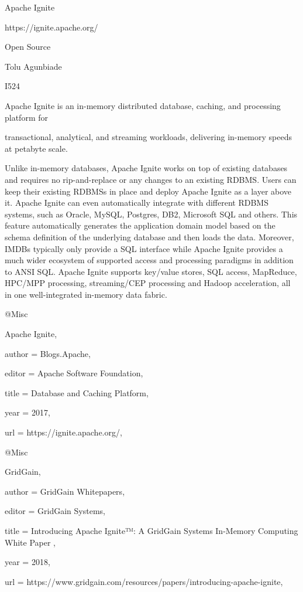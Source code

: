 Apache Ignite

https://ignite.apache.org/

Open Source

Tolu Agunbiade

I524

Apache Ignite is an in-memory distributed database, caching, and processing platform for

transactional, analytical, and streaming workloads, delivering in-memory speeds at petabyte scale\cite{Apache Ignite}.

Unlike in-memory databases, Apache Ignite works on top of existing databases and requires no rip-and-replace or any changes to an existing RDBMS. Users can keep their existing RDBMSs in place and deploy Apache Ignite as a layer above it. Apache Ignite can even automatically integrate with different RDBMS systems, such as Oracle, MySQL, Postgres, DB2, Microsoft SQL and others. This feature automatically generates the application domain model based on the schema definition of the underlying database and then loads the data. Moreover, IMDBs typically only provide a SQL interface while Apache Ignite provides a much wider ecosystem of supported access and processing paradigms in addition to ANSI SQL. Apache Ignite supports key/value stores, SQL access, MapReduce, HPC/MPP processing, streaming/CEP processing and Hadoop acceleration, all in one well-integrated in-memory data fabric\cite{GridGain}.

@Misc{Apache Ignite,

  author = {Blogs.Apache},

  editor = {Apache Software Foundation},

  title  = {Database and Caching Platform},

  year   = {2017},

  url    = {https://ignite.apache.org/},

}

@Misc{GridGain,

  author = {GridGain Whitepapers},

  editor = {GridGain Systems},

  title  = {Introducing Apache Ignite™: A GridGain Systems In-Memory Computing White Paper },

  year   = {2018},

  url    = {https://www.gridgain.com/resources/papers/introducing-apache-ignite},

}
